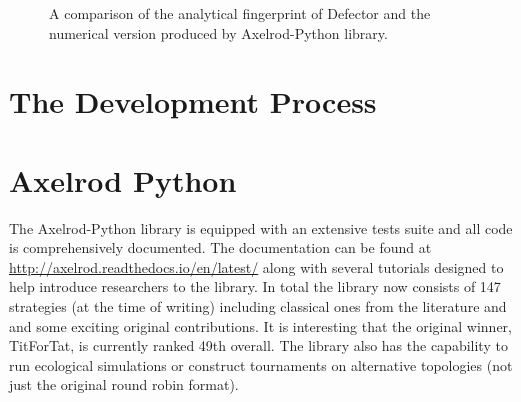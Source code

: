 \begin{figure}[htbp!]
\caption{A comparison of the analytical fingerprint of Defector and the numerical version produced by Axelrod-Python library.}
\label{fig:Defector-comparison}
\end{figure}

\section{The Development Process}

\section{Axelrod Python}

The Axelrod-Python library is equipped with an extensive tests suite and all code is comprehensively documented.
The documentation can be found at \url{http://axelrod.readthedocs.io/en/latest/} along with several tutorials designed to help introduce researchers to the library.
In total the library now consists of 147 strategies (at the time of writing) including classical ones from the literature and and some exciting original contributions.
It is interesting that the original winner, TitForTat, is currently ranked 49th overall.
The library also has the capability to run ecological simulations or construct tournaments on alternative topologies (not just the original round robin format).

